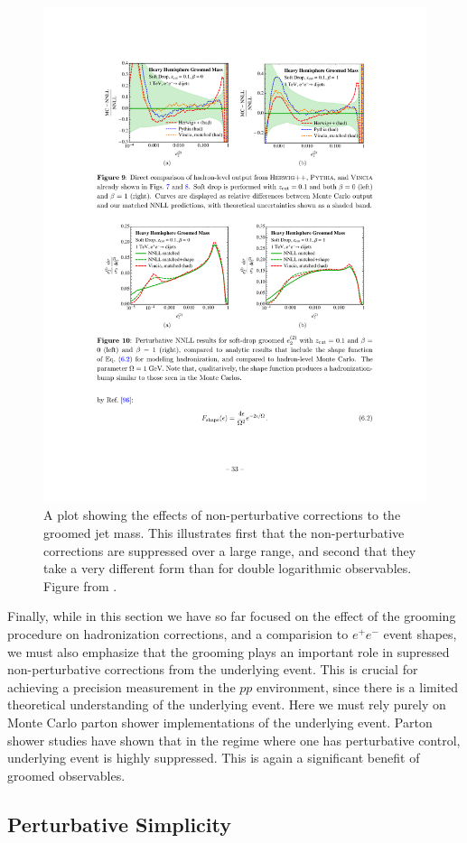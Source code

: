 \begin{figure}
\begin{center}
\includegraphics[width = 0.6\columnwidth]{figures/shape_function.pdf}
\end{center}
\caption{A plot showing the effects of non-perturbative corrections to the groomed jet mass. This illustrates first that the non-perturbative corrections are suppressed over a large range, and second that they take a very different form than for double logarithmic observables. Figure from \cite{Frye:2016aiz}. }
\label{fig:shape_function}
\end{figure}




Finally, while in this section we have so far focused on the effect of the grooming procedure on hadronization corrections, and a comparision to $e^+e^-$ event shapes, we must also emphasize that the grooming plays an important role in supressed non-perturbative corrections from the underlying event. This is crucial for achieving a precision measurement in the $pp$ environment, since there is a limited theoretical understanding of the underlying event. Here we must rely purely on Monte Carlo parton shower implementations of the underlying event. Parton shower studies have shown that in the regime where one has perturbative control, underlying event is highly suppressed. This is again a significant benefit of groomed observables. 




\subsection{Perturbative Simplicity}
\label{sec:pertsimplicity}


